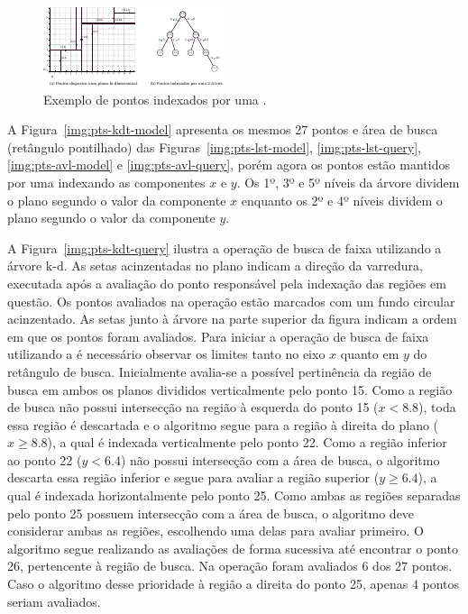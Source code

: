 \begin{figure}
  \centering
  \includegraphics[scale=4.8]{img/kdt/dom-kd}
  \caption{Exemplo de pontos indexados por uma \kdtree{}.}
  \label{fig:kdom-kd}
\end{figure}

A Figura~\ref{img:pts-kdt-model} apresenta os mesmos 27 pontos e
área de busca (retângulo pontilhado) das Figuras~\ref{img:pts-lst-model},
\ref{img:pts-lst-query}, \ref{img:pts-avl-model} e \ref{img:pts-avl-query},
porém agora os pontos estão mantidos por uma \kdtree{} indexando as componentes
$x$ e $y$.
Os 1º, 3º e 5º níveis da árvore dividem o plano segundo o valor da componente $x$
enquanto os 2º e 4º níveis dividem o plano segundo o valor da componente $y$.

A Figura~\ref{img:pts-kdt-query} ilustra a operação de busca de faixa utilizando
a árvore k-d.
As setas acinzentadas no plano indicam a direção da varredura, executada após
a avaliação do ponto responsável pela indexação das regiões em questão.
Os pontos avaliados na operação estão marcados com um fundo circular acinzentado.
As setas junto à árvore na parte superior da figura indicam a ordem em que os
pontos foram avaliados.
Para iniciar a operação de busca de faixa utilizando a \kdtree{} é necessário
observar os limites tanto no eixo $x$ quanto em $y$ do retângulo de busca.
Inicialmente avalia-se a possível pertinência da região de busca em ambos os
planos divididos verticalmente pelo ponto 15.
Como a região de busca não possui intersecção na região à esquerda do ponto 15
($x < 8.8$),
toda essa região é descartada e o algoritmo segue para a região à direita do plano ($x \geq 8.8$),
a qual é indexada verticalmente pelo ponto 22.
Como a região inferior ao ponto 22 ($y < 6.4$) não possui intersecção com a
área de busca, o algoritmo descarta essa região inferior e segue para avaliar a
região superior ($y \geq 6.4$), a qual é indexada horizontalmente pelo ponto 25.
Como ambas as regiões separadas pelo ponto 25 possuem intersecção com a
área de busca, o algoritmo deve considerar ambas as regiões, escolhendo uma
delas para avaliar primeiro.
O algoritmo segue realizando as avaliações de forma sucessiva
até encontrar o ponto 26, pertencente à região de busca.
Na operação foram avaliados $6$ dos $27$ pontos.
Caso o algoritmo desse prioridade à região a direita do ponto 25,
apenas $4$ pontos seriam avaliados.

